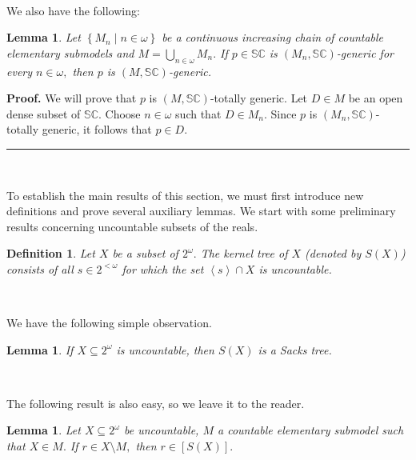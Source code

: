 \documentclass{article}
\newtheorem{definition}[theorem]{Definition}
\newtheorem{lemma}[theorem]{Lemma}
\newenvironment{proof}[1][Proof]{\noindent\textbf{#1.} }{\ \rule{0.5em}{0.5em}}
\begin{document}
\qquad\qquad\ \ \ \ \ \qquad\ \ \ \ \ \qquad\qquad\qquad\ \ \ 

We also have the following:

\begin{lemma}
Let $\left\{  M_{n}\mid n\in\omega\right\}  $ be a continuous increasing chain
of countable elementary submodels and $M=\bigcup\limits_{n\in\omega}M_{n}.$ If
$p\in\mathbb{SC}$ is $(M_{n},\mathbb{SC})$-generic for every $n\in\omega,$
then $p$ is $(M,\mathbb{SC})$-generic. \label{Lema union genericidad}
\end{lemma}

\begin{proof}
We will prove that $p$ is $(M,\mathbb{SC})$-totally generic. Let $D\in M$ be
an open dense subset of $\mathbb{SC}.$ Choose $n\in\omega$ such that $D\in
M_{n}.$ Since $p$ is $(M_{n},\mathbb{SC})$-totally generic, it follows that
$p\in D.$
\end{proof}

\qquad\ \qquad\ \ \ \qquad\ \ \ \ \ \ 

To establish the main results of this section, we must first introduce new
definitions and prove several auxiliary lemmas. We start with some preliminary
results concerning uncountable subsets of the reals.

\begin{definition}
Let $X$ be a subset of $2^{\omega}.$ The \emph{kernel tree of} $X$ (denoted by
$S\left(  X\right)  $) consists of all $s\in2^{<\omega}$ for which the set
$\left\langle s\right\rangle \cap X$ is uncountable.
\end{definition}

\qquad\ \qquad\ \ \ 

We have the following simple observation.

\begin{lemma}
If $X\subseteq2^{\omega}$ is uncountable, then $S\left(  X\right)  $ is a
Sacks tree. \label{Lema es Sacks tree}
\end{lemma}

\qquad\qquad\ \ \ \ 

The following result is also easy, so we leave it to the reader.

\begin{lemma}
Let $X\subseteq2^{\omega}$ be uncountable, $M$ a countable elementary submodel
such that $X\in M.$ If $r\in X\setminus M,$ then $r\in\left[  S\left(
X\right)  \right]  .$ \label{Lemma Kernel modelo}
\end{lemma}
\end{document}
